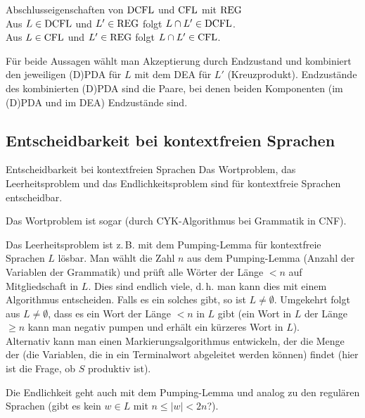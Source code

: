 \linie

\begin{Satz}{Abschlusseigenschaften von $\text{DCFL}$ und $\text{CFL}$ mit $\text{REG}$}\\
    Aus $L \in \text{DCFL}$ und $L' \in \text{REG}$ folgt $L \cap L' \in \text{DCFL}$.\\
    Aus $L \in \text{CFL}$ und $L' \in \text{REG}$ folgt $L \cap L' \in \text{CFL}$.
\end{Satz}

\begin{Beweis}
    Für beide Aussagen wählt man Akzeptierung durch Endzustand und kombiniert
    den jeweiligen (D)PDA für $L$ mit dem DEA für $L'$ (Kreuzprodukt).
    Endzustände des kombinierten (D)PDA sind die Paare, bei denen beiden
    Komponenten (im (D)PDA und im DEA) Endzustände sind.
\end{Beweis}

\pagebreak

\subsection{%
    Entscheidbarkeit bei kontextfreien Sprachen%
}

\begin{Satz}{Entscheidbarkeit bei kontextfreien Sprachen}
    Das Wortproblem, das Leerheitsproblem und das Endlichkeitsproblem sind
    für kontextfreie Sprachen entscheidbar.
\end{Satz}

\begin{Beweis}
    Das Wortproblem ist sogar 
    (durch CYK-Algorithmus bei Grammatik in CNF).
    
    Das Leerheitsproblem ist z.\,B. mit dem Pumping-Lemma für kontextfreie
    Sprachen $L$ lösbar.
    Man wählt die Zahl $n$ aus dem Pumping-Lemma
    (Anzahl der Variablen der Grammatik) und prüft alle Wörter der Länge $< n$
    auf Mitgliedschaft in $L$.
    Dies sind endlich viele, d.\,h. man kann dies mit einem Algorithmus
    entscheiden.
    Falls es ein solches gibt, so ist $L \not= \emptyset$.
    Umgekehrt folgt aus $L \not= \emptyset$, dass es ein Wort der Länge $< n$
    in $L$ gibt
    (ein Wort in $L$ der Länge $\ge n$ kann man negativ pumpen und erhält ein
    kürzeres Wort in $L$).\\
    Alternativ kann man einen Markierungsalgorithmus entwickeln, der die
    Menge der 
    (die Variablen, die in ein Terminalwort abgeleitet werden können)
    findet (hier ist die Frage, ob $S$ produktiv ist).
    
    Die Endlichkeit geht auch mit dem Pumping-Lemma und analog zu den regulären
    Sprachen (gibt es kein $w \in L$ mit $n \le |w| < 2n$?).
\end{Beweis}

